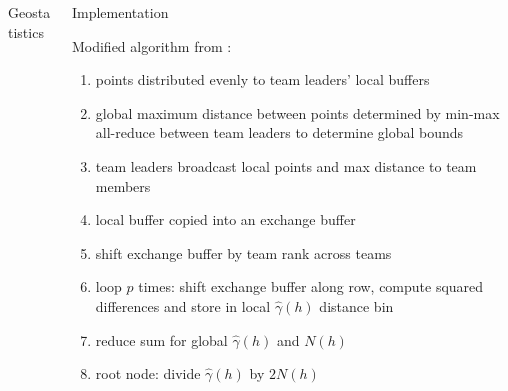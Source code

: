 \documentclass[serif,mathserif,final]{beamer}
\begin{document}
\begin{frame}{}
\begin{columns}[t]
\begin{column}{0.32\linewidth}
\begin{block}{Geostatistics}
      \end{block}
  

    \end{column}%

    \begin{column}{0.32\linewidth}

      \begin{block}{Implementation}
	
      \begin{flushleft} Modified algorithm from \cite{Koanantakool}:
        \begin{enumerate}
          \item points distributed evenly to team leaders' local buffers
          \item global maximum distance between points determined by min-max all-reduce between team leaders to determine global bounds
          \item team leaders broadcast local points and max distance to team members
          \item local buffer copied into an exchange buffer
          \item shift exchange buffer by team rank across teams
          \item loop $p$ times: shift exchange buffer along row, compute squared differences and store in local $\hat{\gamma}(h)$ distance bin
          \item reduce sum for global $\hat{\gamma}(h)$ and $N(h)$
          \item root node: divide $\hat{\gamma}(h)$ by $2N(h)$ 
        \end{enumerate}
        \end{flushleft}
      \end{block}
      
    
      

\end{column}
\end{columns}
\end{frame}
\end{document}
